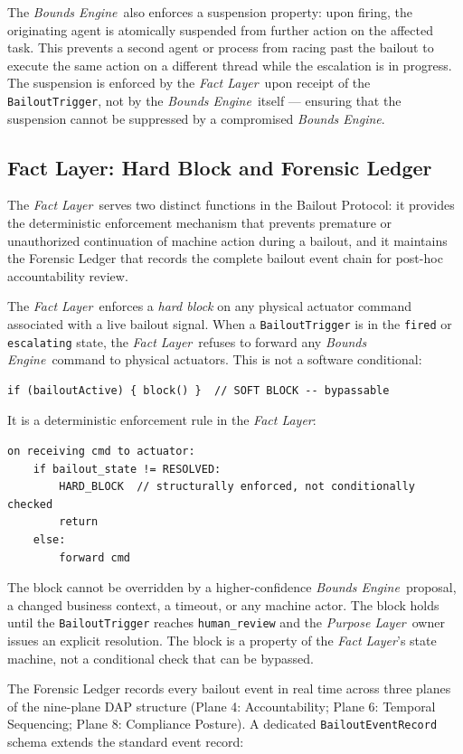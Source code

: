 \documentclass[12pt]{article}
\newcommand{\purpose}{\textit{Purpose Layer}}
\newcommand{\bounds}{\textit{Bounds Engine}}
\newcommand{\fact}{\textit{Fact Layer}}
\begin{document}
The \bounds\ also enforces a suspension property: upon firing, the originating agent is atomically suspended from further action on the affected task. This prevents a second agent or process from racing past the bailout to execute the same action on a different thread while the escalation is in progress. The suspension is enforced by the \fact\ upon receipt of the \texttt{BailoutTrigger}, not by the \bounds\ itself --- ensuring that the suspension cannot be suppressed by a compromised \bounds.

\subsection{Fact Layer: Hard Block and Forensic Ledger}
\label{sec:fact-enforcement}

The \fact\ serves two distinct functions in the Bailout Protocol: it provides the deterministic enforcement mechanism that prevents premature or unauthorized continuation of machine action during a bailout, and it maintains the Forensic Ledger that records the complete bailout event chain for post-hoc accountability review.

The \fact\ enforces a \textit{hard block} on any physical actuator command associated with a live bailout signal. When a \texttt{BailoutTrigger} is in the \texttt{fired} or \texttt{escalating} state, the \fact\ refuses to forward any \bounds\ command to physical actuators. This is not a software conditional:

\begin{verbatim}
if (bailoutActive) { block() }  // SOFT BLOCK -- bypassable
\end{verbatim}

It is a deterministic enforcement rule in the \fact:

\begin{verbatim}
on receiving cmd to actuator:
    if bailout_state != RESOLVED:
        HARD_BLOCK  // structurally enforced, not conditionally checked
        return
    else:
        forward cmd
\end{verbatim}

The block cannot be overridden by a higher-confidence \bounds\ proposal, a changed business context, a timeout, or any machine actor. The block holds until the \texttt{BailoutTrigger} reaches \texttt{human\_review} and the \purpose\ owner issues an explicit resolution. The block is a property of the \fact's state machine, not a conditional check that can be bypassed.

The Forensic Ledger records every bailout event in real time across three planes of the nine-plane DAP structure (Plane 4: Accountability; Plane 6: Temporal Sequencing; Plane 8: Compliance Posture). A dedicated \texttt{BailoutEventRecord} schema extends the standard event record:
\end{document}
